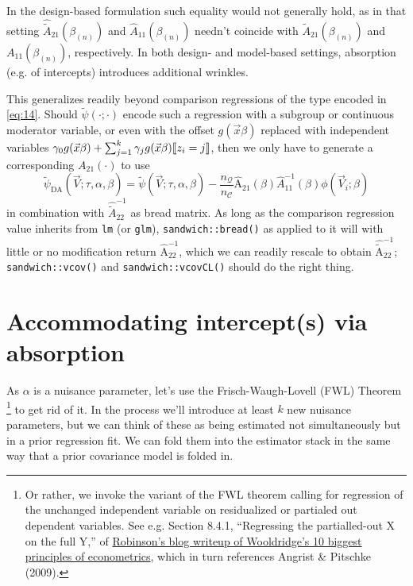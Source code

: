 \documentclass{article}
\DeclarePairedDelimiter{\indicator}{\llbracket}{\rrbracket}
\begin{document}
In the design-based formulation such equality would not generally
hold, as in that setting
$\hat{\tilde{A}}_{21}(\beta_{(n)})$ and $\hat{A}_{11}(\beta_{(n)})$ needn't
coincide with $\tilde{A}_{21}(\beta_{(n)})$ and ${A}_{11}(\beta_{(n)})$, respectively.  In both design- and model-based settings, absorption (e.g. of intercepts) introduces additional wrinkles.

This generalizes readily beyond comparison regressions of the type encoded in \eqref{eq:14}. Should $\tilde{\psi}(\cdot; \cdot)$ encode such a regression with a subgroup or continuous moderator variable, or even with the offset $g(\vec{x}\beta)$ replaced with independent variables $\gamma_{0}g(\vec{x}\beta) + \sum_{j=1}^{k}\gamma_{j} g(\vec{x}\beta)\indicator{z_{i}=j}$, then we only have to generate a corresponding ${A}_{21}(\cdot)$ to use
\begin{equation*}\label{eq:24}
      \tilde{\psi}_\text{DA}(\vec{V}; \tau, \alpha, 
    \beta) = \tilde{\psi} (\vec{V}; \tau,\alpha, 
    \beta) -
    \frac{n_{\mathcal{Q}}}{n_{\mathcal{C}}}
    \hat{\mathrm{A}}_{21}(\beta) \hat{A}_{11}^{-1}(\beta)\phi(\vec{V}_{i};
    \beta)
\end{equation*}
in combination with $\hat{\tilde{A}}_{22}^{-1}$ as bread matrix. As long as the comparison regression value inherits from \texttt{lm} (or \texttt{glm}), \texttt{sandwich::bread()} as applied to it will with little or no modification return
$\hat{\mathrm{A}}_{22}^{-1}$, which we can readily rescale to obtain $\hat{\tilde{\mathrm{A}}}_{22}^{-1}$; \texttt{sandwich::vcov()} and \texttt{sandwich::vcovCL()} should do the right thing.


\section{Accommodating intercept(s) via absorption}\label{sec:accomm-interc-via}
As $\alpha$ is a nuisance parameter, let's use the
Frisch-Waugh-Lovell (FWL) Theorem%
\footnote{Or rather, we invoke the variant of the FWL theorem calling
  for regression of the unchanged independent variable on residualized
or partialed out dependent variables.  See e.g. Section 8.4.1,
``Regressing the partialled-out X on the full Y,'' of
\href{https://bookdown.org/ts_robinson1994/10_fundamental_theorems_for_econometrics/frisch.html}{Robinson's
  blog writeup of Wooldridge's 10 biggest principles of econometrics},
which in turn references Angrist \& Pitschke (2009).} to get rid of it.  In the process we'll
introduce at least $k$ new nuisance parameters, but we can think of these as
being estimated not simultaneously but in a prior regression fit.
We can fold them into the estimator stack in the same way that a prior
covariance model is folded in.
\end{document}
